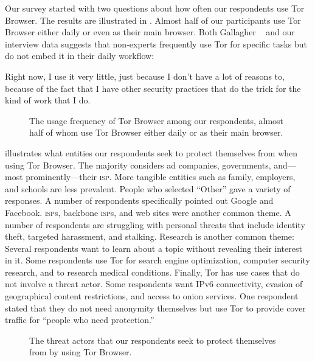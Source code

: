 Our survey started with two questions about how often our respondents use Tor
Browser.  The results are illustrated in .  Almost half of
our participants use Tor Browser either daily or even as their main browser.
Both Gallagher \ea~\cite[\S~4.3.2]{Gallagher2017a} and our interview data
suggests that non-experts frequently use Tor for specific tasks but do not embed
it in their daily workflow:

\begin{displayquote}[P07]
Right now, I use it very little, just because I don't have a lot of reasons to,
because of the fact that I have other security practices that do the trick for
the kind of work that I do.
\end{displayquote}

\begin{figure}[t]
    \centering
    
    \caption{The usage frequency of Tor Browser among our respondents, almost
    half of whom use Tor Browser either daily or as their main browser.}
    \label{fig:tor-usage}
\end{figure}

 illustrates what entities our respondents seek to protect
themselves from when using Tor Browser.  The majority considers ad companies,
governments, and---most prominently---their \textsc{isp}.  More tangible
entities such as family, employers, and schools are less prevalent.  People who
selected ``Other'' gave a variety of responses.  A number of respondents
specifically pointed out Google and Facebook.  \textsc{isp}s, backbone
\textsc{isp}s, and web sites were another common theme.  A number of respondents
are struggling with personal threats that include identity theft, targeted
harassment, and stalking.  Research is another common theme: Several respondents
want to learn about a topic without revealing their interest in it.  Some
respondents use Tor for search engine optimization, computer security research,
and to research medical conditions.  Finally, Tor has use cases that do not
involve a threat actor.  Some respondents want IPv6 connectivity, evasion of
geographical content restrictions, and access to onion services.  One respondent
stated that they do not need anonymity themselves but use Tor to provide cover
traffic for ``people who need protection.''


\begin{figure}[t]
    \centering
    
    \caption{The threat actors that our respondents seek to protect themselves
    from by using Tor Browser.}
    \label{fig:tor-threats}
\end{figure}

